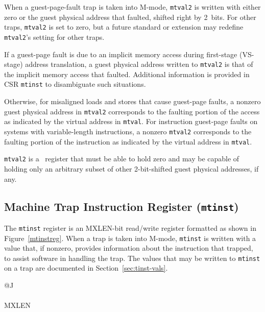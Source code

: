 When a guest-page-fault trap is taken into M-mode, {\tt mtval2} is
written with either zero or the guest physical address that faulted,
shifted right by 2~bits.
For other traps, {\tt mtval2} is set to zero, but a future standard or
extension may redefine {\tt mtval2}'s setting for other traps.

If a guest-page fault is due to an implicit memory access during
first-stage (VS-stage) address translation, a guest physical address
written to {\tt mtval2} is that of the implicit memory access that
faulted.
Additional information is provided in CSR {\tt mtinst} to disambiguate
such situations.

Otherwise, for misaligned loads and stores that cause guest-page faults,
a nonzero guest physical address in {\tt mtval2} corresponds to the
faulting portion of the access as indicated by the virtual address in
{\tt mtval}.
For instruction guest-page faults on systems with variable-length
instructions, a nonzero {\tt mtval2} corresponds to the faulting portion
of the instruction as indicated by the virtual address in {\tt mtval}.

{\tt mtval2} is a \warl\ register that must be able to hold zero and may
be capable of holding only an arbitrary subset of other 2-bit-shifted
guest physical addresses, if any.

\subsection{Machine Trap Instruction Register ({\tt mtinst})}

The {\tt mtinst} register is an MXLEN-bit read/write register formatted
as shown in Figure~\ref{mtinstreg}.
When a trap is taken into M-mode, {\tt mtinst} is written with a value
that, if nonzero, provides information about the instruction that
trapped, to assist software in handling the trap.
The values that may be written to {\tt mtinst} on a trap are documented
in Section~\ref{sec:tinst-vals}.

\begin{figure*}[h!]
{\footnotesize
\begin{center}
\begin{tabular}{@{}J}
 \\
\hline
{} \\
\hline
MXLEN \\
\end{tabular}
\end{center}
}
\vspace{-0.1in}
\caption{Machine trap instruction register ({\tt mtinst}).}
\label{mtinstreg}
\end{figure*}


